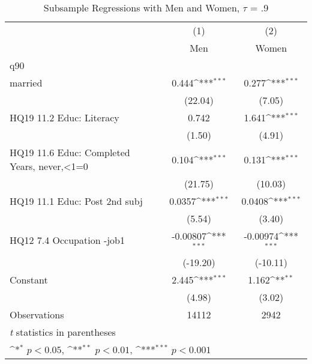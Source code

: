 \begin{table}[htbp]\centering
\def\sym#1{\ifmmode^{#1}\else\(^{#1}\)\fi}
\caption{Subsample Regressions with Men and Women, $\tau$ = .9}
\begin{tabular}{l*{2}{c}}
\hline\hline
                    &\multicolumn{1}{c}{(1)}&\multicolumn{1}{c}{(2)}\\
                    &\multicolumn{1}{c}{Men}&\multicolumn{1}{c}{Women}\\
\hline
q90                 &                     &                     \\
married             &       0.444\sym{***}&       0.277\sym{***}\\
                    &     (22.04)         &      (7.05)         \\
[1em]
HQ19 11.2 Educ: Literacy&       0.742         &       1.641\sym{***}\\
                    &      (1.50)         &      (4.91)         \\
[1em]
HQ19 11.6 Educ: Completed Years, never,<1=0&       0.104\sym{***}&       0.131\sym{***}\\
                    &     (21.75)         &     (10.03)         \\
[1em]
HQ19 11.1 Educ: Post 2nd subj&      0.0357\sym{***}&      0.0408\sym{***}\\
                    &      (5.54)         &      (3.40)         \\
[1em]
HQ12 7.4 Occupation -job1&    -0.00807\sym{***}&    -0.00974\sym{***}\\
                    &    (-19.20)         &    (-10.11)         \\
[1em]
Constant            &       2.445\sym{***}&       1.162\sym{**} \\
                    &      (4.98)         &      (3.02)         \\
\hline
Observations        &       14112         &        2942         \\
\hline\hline
\multicolumn{3}{l}{\footnotesize \textit{t} statistics in parentheses}\\
\multicolumn{3}{l}{\footnotesize \sym{*} \(p<0.05\), \sym{**} \(p<0.01\), \sym{***} \(p<0.001\)}\\
\end{tabular}
\end{table}

